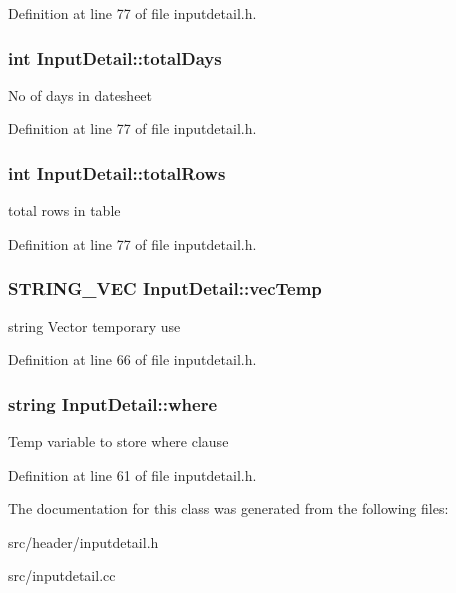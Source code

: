 Definition at line 77 of file inputdetail.\-h.

\hypertarget{classInputDetail_a8d1ba029791bb9b87330400d82cdbcde}{
\subsubsection[{total\-Days}]{\setlength{\rightskip}{0pt plus 5cm}int Input\-Detail\-::total\-Days\hspace{0.3cm}{\ttfamily [protected]}}}\label{classInputDetail_a8d1ba029791bb9b87330400d82cdbcde}
No of days in datesheet 

Definition at line 77 of file inputdetail.\-h.

\hypertarget{classInputDetail_a3710702eafae009629e99f1dc76d5285}{
\subsubsection[{total\-Rows}]{\setlength{\rightskip}{0pt plus 5cm}int Input\-Detail\-::total\-Rows\hspace{0.3cm}{\ttfamily [protected]}}}\label{classInputDetail_a3710702eafae009629e99f1dc76d5285}
total rows in table 

Definition at line 77 of file inputdetail.\-h.

\hypertarget{classInputDetail_abee6a659eb2e34b260aaf8b05d6003b4}{
\subsubsection[{vec\-Temp}]{\setlength{\rightskip}{0pt plus 5cm}S\-T\-R\-I\-N\-G\-\_\-\-V\-E\-C Input\-Detail\-::vec\-Temp\hspace{0.3cm}{\ttfamily [protected]}}}\label{classInputDetail_abee6a659eb2e34b260aaf8b05d6003b4}
string Vector temporary use 

Definition at line 66 of file inputdetail.\-h.

\hypertarget{classInputDetail_a79d8a59940f25f4d2089e241c71a4279}{
\subsubsection[{where}]{\setlength{\rightskip}{0pt plus 5cm}string Input\-Detail\-::where\hspace{0.3cm}{\ttfamily [protected]}}}\label{classInputDetail_a79d8a59940f25f4d2089e241c71a4279}
Temp variable to store where clause 

Definition at line 61 of file inputdetail.\-h.



The documentation for this class was generated from the following files\-:\begin{DoxyCompactItemize}
\item 
src/header/inputdetail.\-h\item 
src/inputdetail.\-cc\end{DoxyCompactItemize}
